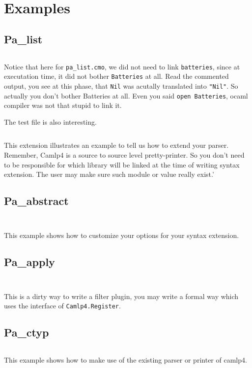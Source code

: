 \section{Examples}

\subsection{Pa\_list}
\inputminted[fontsize=\scriptsize, fontsize=\scriptsize, ]{ocaml}{camlp4/example/pa_list.ml}


Notice that here for \verb|pa_list.cmo|, we did not need to link
\verb|batteries|, since at executation time, it did not bother
\verb|Batteries| at all. Read the commented output, you see at this
phase, that \verb|Nil| was acutally translated into \verb|"Nil"|. So
actually you don't bother Batteries at all. Even you said
\verb|open Batteries|, ocaml compiler was not that stupid to link it.


The test file is also interesting.
\inputminted[fontsize=\scriptsize, fontsize=\scriptsize, ]{ocaml}{camlp4/example/test_pa_list.ml}


This extension illustrates an example to tell us how to extend your
parser. Remember, Camlp4 is a source to source level
pretty-printer. So you don't need to be responsible for which library
will be linked at the time of writing syntax extension. The user may
make sure such module or value really exist.'


\subsection{Pa\_abstract}
\inputminted[fontsize=\scriptsize, fontsize=\scriptsize, ]{ocaml}{camlp4/example/pa_abstract.ml}
\inputminted[fontsize=\scriptsize, fontsize=\scriptsize, ]{ocaml}{camlp4/example/test_pa_abstract.ml}
This example shows how to customize your options for your syntax extension.


\subsection{Pa\_apply}
\inputminted[fontsize=\scriptsize, fontsize=\scriptsize, ]{ocaml}{camlp4/example/pa_apply.ml}
\inputminted[fontsize=\scriptsize, fontsize=\scriptsize, ]{ocaml}{camlp4/example/test_pa_apply.ml}
This is a dirty way to write a filter plugin, you may write a formal
way which uses the interface of \verb|Camlp4.Register|.


\subsection{Pa\_ctyp}
\inputminted[fontsize=\scriptsize, fontsize=\scriptsize, ]{ocaml}{camlp4/example/pa_ctyp.ml}
This example shows how to make use of the existing parser or printer
of camlp4.


